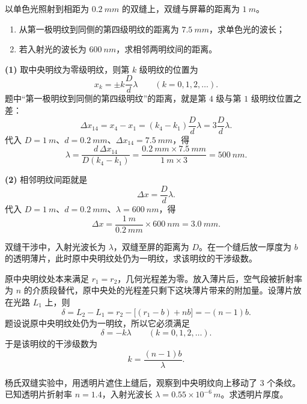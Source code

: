 \documentclass[lang=cn,11pt]{elegantbook}
\begin{document}
\begin{exercise}[双缝条纹间距]
以单色光照射到相距为 \(\SI{0.2}{mm}\) 的双缝上，双缝与屏幕的距离为 \(\SI{1}{m}\)。
\begin{enumerate}
 \item 从第一极明纹到同侧的第四级明纹的距离为 \(\SI{7.5}{mm}\)，求单色光的波长；
 \item 若入射光的波长为 \(\SI{600}{nm}\)，求相邻两明纹间的距离。
\end{enumerate}
\end{exercise}

\begin{solution}
\textbf{(1)} 取中央明纹为零级明纹，则第 \(k\) 级明纹的位置为
\[
x_k=\pm k\frac{D}{d}\lambda \qquad (k=0,1,2,\dots).
\]
题中“第一极明纹到同侧的第四级明纹”的距离，就是第 \(4\) 级与第 \(1\) 级明纹位置之差：
\[
\Delta x_{14}=x_4-x_1=(k_4-k_1)\frac{D}{d}\lambda=3\frac{D}{d}\lambda.
\]
代入 \(D=\SI{1}{m}\)、\(d=\SI{0.2}{mm}\)、\(\Delta x_{14}=\SI{7.5}{mm}\)，得
\[
\lambda=\frac{d\,\Delta x_{14}}{D(k_4-k_1)}
=\frac{\SI{0.2}{mm}\times\SI{7.5}{mm}}{\SI{1}{m}\times 3}
=\SI{500}{nm}.
\]

\textbf{(2)} 相邻明纹间距就是
\[
\Delta x=\frac{D}{d}\lambda.
\]
代入 \(D=\SI{1}{m}\)、\(d=\SI{0.2}{mm}\)、\(\lambda=\SI{600}{nm}\)，得
\[
\Delta x=\frac{\SI{1}{m}}{\SI{0.2}{mm}}\times\SI{600}{nm}=\SI{3.0}{mm}.
\]
\end{solution}

\begin{exercise}[双缝加透明薄片后原中央明纹的级次]
双缝干涉中，入射光波长为 \(\lambda\)，双缝至屏的距离为 \(D\)。在一个缝后放一厚度为 \(b\) 的透明薄片，此时原中央明纹处仍为一明纹，求该明纹的干涉级数。
\end{exercise}

\begin{solution}
原中央明纹处本来满足 \(r_1=r_2\)，几何光程差为零。放入薄片后，空气段被折射率为 \(n\) 的介质段替代，原中央处的光程差只剩下这块薄片带来的附加量。设薄片放在光路 \(L_1\) 上，则
\[
\delta=L_2-L_1
=r_2-\bigl[(r_1-b)+nb\bigr]
=-(n-1)b.
\]
题设说原中央明纹处仍为一明纹，所以它必须满足
\[
\delta=-k\lambda\qquad (k=0,1,2,\dots).
\]
于是该明纹的干涉级数为
\[
k=\frac{(n-1)b}{\lambda}.
\]
\end{solution}


\begin{exercise}
杨氏双缝实验中，用透明片遮住上缝后，观察到中央明纹向上移动了 3 个条纹。已知透明片折射率 \(n=1.4\)，入射光波长 \(\lambda=0.55\times10^{-6}\,\si{m}\)。求透明片厚度。
\end{exercise}
\end{document}
